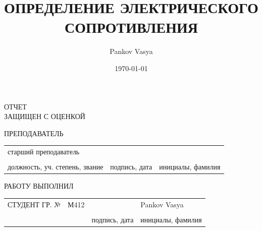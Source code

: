 \documentclass[14pt]{extarticle}
\author{Pankov Vasya}
\date{\today}
\title{ОПРЕДЕЛЕНИЕ ЭЛЕКТРИЧЕСКОГО СОПРОТИВЛЕНИЯ}
\begin{document}
\begin{small}
\begin{titlepage}

\linespread{1}\selectfont{}

\vspace{32pt}


\vspace{60pt}

\raggedright{ОТЧЕТ \\
ЗАЩИЩЕН С ОЦЕНКОЙ}
\vspace{14pt}

\raggedright{ПРЕПОДАВАТЕЛЬ}

\vspace{12pt}

\begin{tabularx}{\textwidth}{ >{\centering\arraybackslash}X >{\centering\arraybackslash}X >{\centering\arraybackslash}X }
	 старший преподаватель & &  \\ 
	 \hrulefill & \hrulefill & \hrulefill \\ 
\footnotesize{должность, уч. степень, звание} & \footnotesize{подпись, дата} & \footnotesize{инициалы, фамилия} \\ 
\end{tabularx} 
 
\vspace{48pt} 


\vspace{40pt} 


\vspace{40pt} 


\vspace*{\fill} 

\raggedright{РАБОТУ ВЫПОЛНИЛ} 

\vspace{10pt} 

\begin{tabularx}{\textwidth}{>{\raggedright\arraybackslash}X  >{\centering\arraybackslash}X >{\centering\arraybackslash}X >{\centering\arraybackslash}X }
СТУДЕНТ ГР. № & М412 & & Pankov Vasya \\ 
	 & \hrulefill & \hrulefill & \hrulefill \\ 
	 &  & \footnotesize{подпись, дата} & \footnotesize{инициалы, фамилия} \\ 
\end{tabularx} 
 
\vspace*{\fill} 


\end{titlepage}
\end{small}
\end{document}
